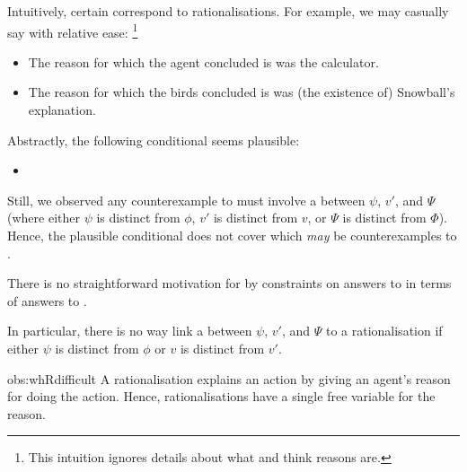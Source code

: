 \begin{note}
  Intuitively, certain  correspond to rationalisations.
  For example, we may casually say with relative ease:%
  \footnote{
    This intuition ignores details about what \citeauthor{Davidson:1963aa} and \citeauthor{Hieronymi:2011aa} think reasons are.
  }

  \begin{itemize}
  \item
    The reason for which the agent concluded \propM{\gistCalcEq{}} is  was the calculator.
  \item
    The reason for which the birds concluded  is  was (the existence of) Snowball's explanation.
  \end{itemize}
  Abstractly, the following conditional seems plausible:
  \begin{itemize}
  \item
  \end{itemize}
  Still, we observed any counterexample to \issueInclusion{} must involve a \ros{} between \(\psi\), \(v'\), and \(\Psi\) (where either \(\psi\) is distinct from \(\phi\), \(v'\) is distinct from \(v\), or \(\Psi\) is distinct from \(\Phi\)).
  Hence, the plausible conditional does not cover  which \emph{may} be counterexamples to \issueInclusion{}.

  \begin{observation}
    \label{obs:whRdifficult}%
    There is no straightforward motivation for \issueInclusion{} by constraints on answers to \qWhyR{} in terms of answers to \qHow{}.

    In particular, there is no way link a \ros{} between \(\psi\), \(v'\), and \(\Psi\) to a rationalisation if either \(\psi\) is distinct from \(\phi\) or \(v\) is distinct from \(v'\).
  \end{observation}

  \begin{motivation}{obs:whRdifficult}%
    A rationalisation explains an action by giving an agent's reason for doing the action.
    Hence, rationalisations have a single free variable for the \agents{} reason.


\end{motivation}
\end{note}
